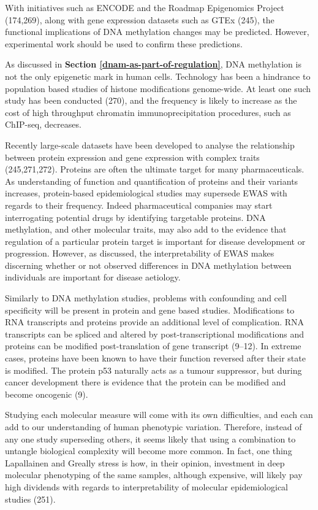 \documentclass[11pt,twoside]{bristolthesis}
\begin{document}
With initiatives such as ENCODE and the Roadmap Epigenomics Project (174,269), along with gene expression datasets such as GTEx (245), the functional implications of DNA methylation changes may be predicted. However, experimental work should be used to confirm these predictions.

As discussed in \textbf{Section \ref{dnam-as-part-of-regulation}}, DNA methylation is not the only epigenetic mark in human cells. Technology has been a hindrance to population based studies of histone modifications genome-wide. At least one such study has been conducted (270), and the frequency is likely to increase as the cost of high throughput chromatin immunoprecipitation procedures, such as ChIP-seq, decreases.

Recently large-scale datasets have been developed to analyse the relationship between protein expression and gene expression with complex traits (245,271,272). Proteins are often the ultimate target for many pharmaceuticals. As understanding of function and quantification of proteins and their variants increases, protein-based epidemiological studies may supersede EWAS with regards to their frequency. Indeed pharmaceutical companies may start interrogating potential drugs by identifying targetable proteins. DNA methylation, and other molecular traits, may also add to the evidence that regulation of a particular protein target is important for disease development or progression. However, as discussed, the interpretability of EWAS makes discerning whether or not observed differences in DNA methylation between individuals are important for disease aetiology.

Similarly to DNA methylation studies, problems with confounding and cell specificity will be present in protein and gene based studies. Modifications to RNA transcripts and proteins provide an additional level of complication. RNA transcripts can be spliced and altered by post-transcriptional modifications and proteins can be modified post-translation of gene transcript (9--12). In extreme cases, proteins have been known to have their function reversed after their state is modified. The protein p53 naturally acts as a tumour suppressor, but during cancer development there is evidence that the protein can be modified and become oncogenic (9).

Studying each molecular measure will come with its own difficulties, and each can add to our understanding of human phenotypic variation. Therefore, instead of any one study superseding others, it seems likely that using a combination to untangle biological complexity will become more common. In fact, one thing Lapallainen and Greally stress is how, in their opinion, investment in deep molecular phenotyping of the same samples, although expensive, will likely pay high dividends with regards to interpretability of molecular epidemiological studies (251).
\end{document}
